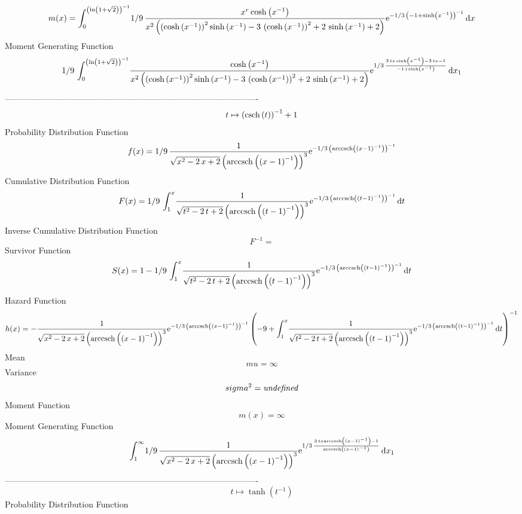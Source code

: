 \documentclass[12pt]{article}
\begin{document}
 $$ m(x) = \int_{0}^{ \left( \ln  \left( 1+\sqrt {2} \right)  \right) ^{-1}}\!1/9
\,{\frac {{x}^{r}\cosh \left( {x}^{-1} \right) }{{x}^{2} \left( 
 \left( \cosh \left( {x}^{-1} \right)  \right) ^{2}\sinh \left( {x}^{-
1} \right) -3\, \left( \cosh \left( {x}^{-1} \right)  \right) ^{2}+2\,
\sinh \left( {x}^{-1} \right) +2 \right) }{{\rm e}^{-1/3\, \left( -1+
\sinh \left( {x}^{-1} \right)  \right) ^{-1}}}}\,{\rm d}x
$$ Moment Generating Function 
 $$1/9\,\int_{0}^{ \left( \ln  \left( 1+\sqrt {2} \right)  \right) ^{-1}}
\!{\frac {\cosh \left( {x}^{-1} \right) }{{x}^{2} \left(  \left( \cosh
 \left( {x}^{-1} \right)  \right) ^{2}\sinh \left( {x}^{-1} \right) -3
\, \left( \cosh \left( {x}^{-1} \right)  \right) ^{2}+2\,\sinh \left( 
{x}^{-1} \right) +2 \right) }{{\rm e}^{1/3\,{\frac {3\,tx\sinh \left( 
{x}^{-1} \right) -3\,tx-1}{-1+\sinh \left( {x}^{-1} \right) }}}}}
\,{\rm d}x_{{1}}
$$-------------------------------------------------------------------------------------------  \\$$t\mapsto  \left( {\rm csch} \left(t\right) \right) ^{-1}+1
$$Probability Distribution Function 
$$  f(x)=1/9\,{\frac {1}{\sqrt {{x}^{2}-2\,x+2} \left( {\rm arccsch} \left(
 \left( x-1 \right) ^{-1}\right) \right) ^{3}}{{\rm e}^{-1/3\, \left( 
{\rm arccsch} \left( \left( x-1 \right) ^{-1}\right) \right) ^{-1}}}}
$$Cumulative Distribution Function  
 $$F(x)=1/9\,\int_{1}^{x}\!{\frac {1}{\sqrt {{t}^{2}-2\,t+2} \left( 
{\rm arccsch} \left( \left( t-1 \right) ^{-1}\right) \right) ^{3}}{
{\rm e}^{-1/3\, \left( {\rm arccsch} \left( \left( t-1 \right) ^{-1}
\right) \right) ^{-1}}}}\,{\rm d}t
$$ Inverse Cumulative Distribution Function 
  $$F^{-1} = $$Survivor Function 
 $$ S(x)=1-1/9\,\int_{1}^{x}\!{\frac {1}{\sqrt {{t}^{2}-2\,t+2} \left( 
{\rm arccsch} \left( \left( t-1 \right) ^{-1}\right) \right) ^{3}}{
{\rm e}^{-1/3\, \left( {\rm arccsch} \left( \left( t-1 \right) ^{-1}
\right) \right) ^{-1}}}}\,{\rm d}t
$$ Hazard Function 
 $$ h(x)=-{\frac {1}{\sqrt {{x}^{2}-2\,x+2} \left( {\rm arccsch} \left( \left( 
x-1 \right) ^{-1}\right) \right) ^{3}}{{\rm e}^{-1/3\, \left( 
{\rm arccsch} \left( \left( x-1 \right) ^{-1}\right) \right) ^{-1}}}
 \left( -9+\int_{1}^{x}\!{\frac {1}{\sqrt {{t}^{2}-2\,t+2} \left( 
{\rm arccsch} \left( \left( t-1 \right) ^{-1}\right) \right) ^{3}}{
{\rm e}^{-1/3\, \left( {\rm arccsch} \left( \left( t-1 \right) ^{-1}
\right) \right) ^{-1}}}}\,{\rm d}t \right) ^{-1}}
$$Mean 
 $$ mu=\infty 
$$ Variance 
 $$ sigma^2 = {\it undefined}
$$Moment Function 
 $$ m(x) = \infty 
$$ Moment Generating Function 
 $$\int_{1}^{\infty }\!1/9\,{\frac {1}{\sqrt {{x}^{2}-2\,x+2} \left( 
{\rm arccsch} \left( \left( x-1 \right) ^{-1}\right) \right) ^{3}}{
{\rm e}^{1/3\,{\frac {3\,tx{\rm arccsch} \left( \left( x-1 \right) ^{-
1}\right)-1}{{\rm arccsch} \left( \left( x-1 \right) ^{-1}\right)}}}}}
\,{\rm d}x_{{1}}
$$-------------------------------------------------------------------------------------------  \\$$t\mapsto \tanh \left( {t}^{-1} \right) 
$$Probability Distribution Function 
\end{document}
